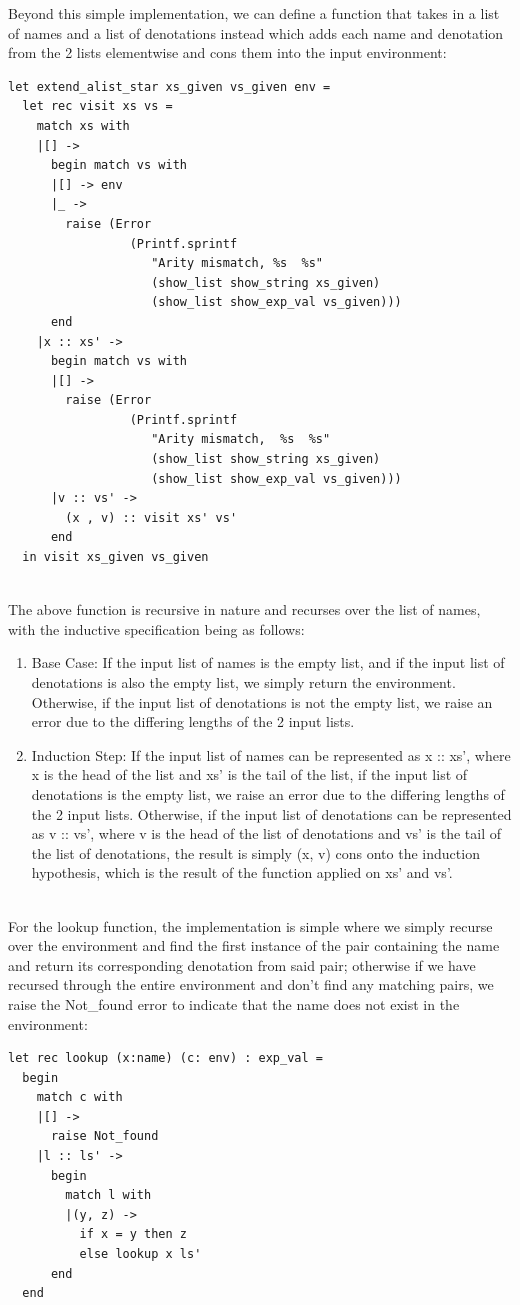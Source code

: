 Beyond this simple implementation, we can define a function that takes in a list of names and a list of denotations instead which adds each name and denotation from the 2 lists elementwise and cons them into the input environment:
\pagebreak
\begin{scriptsize}
\begin{verbatim}
let extend_alist_star xs_given vs_given env =
  let rec visit xs vs = 
    match xs with
    |[] ->
      begin match vs with
      |[] -> env
      |_ ->
        raise (Error
                 (Printf.sprintf
                    "Arity mismatch, %s  %s"
                    (show_list show_string xs_given)
                    (show_list show_exp_val vs_given)))
      end
    |x :: xs' ->
      begin match vs with
      |[] ->
        raise (Error
                 (Printf.sprintf
                    "Arity mismatch,  %s  %s"
                    (show_list show_string xs_given)
                    (show_list show_exp_val vs_given)))
      |v :: vs' ->
        (x , v) :: visit xs' vs'
      end
  in visit xs_given vs_given
\end{verbatim}
\end{scriptsize}
\\
The above function is recursive in nature and recurses over the list of names, with the inductive specification being as follows:
\begin{enumerate}
   \item Base Case: If the input list of names is the empty list, and if the input list of denotations is also the empty list, we simply return the environment. Otherwise, if the input list of denotations is not the empty list, 
   we raise an error due to the differing lengths of the 2 input lists.
   \item Induction Step: If the input list of names can be represented as x :: xs’, where x is the head of the list and xs’ is the tail of the list, if the input list of denotations is the empty list, we raise an error due to 
   the differing lengths of the 2 input lists. Otherwise, if the input list of denotations can be represented as v :: vs’, where v is the head of the list of denotations and vs’ is the tail of the list of denotations, the result 
   is simply (x, v) cons onto the induction hypothesis, which is the result of the function applied on xs’ and vs’.
\end{enumerate}
\\
For the lookup function, the implementation is simple where we simply recurse over the environment and find the first instance of the pair containing the name and return its corresponding denotation from said pair; otherwise 
if we have recursed through the entire environment and don’t find any matching pairs, we raise the Not\_found error to indicate that the name does not exist in the environment:
\begin{scriptsize}
\begin{verbatim}
let rec lookup (x:name) (c: env) : exp_val =
  begin
    match c with
    |[] ->
      raise Not_found
    |l :: ls' ->
      begin
        match l with
        |(y, z) ->
          if x = y then z
          else lookup x ls'
      end
  end
\end{verbatim}
\end{scriptsize}

